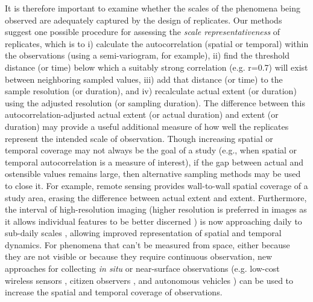 \documentclass[12pt]{article}
\begin{document}
It is therefore important to examine whether the scales of the phenomena being observed are adequately captured by the design of replicates. Our methods suggest one possible procedure for assessing the \emph{scale representativeness} of replicates, which is to i) calculate the autocorrelation (spatial or temporal) within the observations (using a semi-variogram, for example), ii) find the threshold distance (or time) below which a suitably strong correlation (e.g. r=0.7) will exist between neighboring sampled values, iii) add that distance (or time) to the sample resolution (or duration), and iv) recalculate actual extent (or duration) using the adjusted resolution (or sampling duration). The difference between this autocorrelation-adjusted actual extent (or actual duration) and extent (or duration) may provide a useful additional measure of how well the replicates represent the intended scale of observation. Though increasing spatial or temporal coverage may not always be the goal of a study (e.g., when spatial or temporal autocorrelation is a measure of interest), if the gap between actual and ostensible values remains large, then alternative sampling methods may be used to close it. For example, remote sensing provides wall-to-wall spatial coverage of a study area, erasing the difference between actual extent and extent. Furthermore, the interval of high-resolution imaging (higher resolution is preferred in images as it allows individual features to be better discerned \cite{dark_modifiable_2007, hay_comparison_2003}) is now approaching daily to sub-daily scales \cite{drusch_sentinel-2:_2012, hand_startup_2015}, allowing improved representation of spatial and temporal dynamics. For phenomena that can't be measured from space, either because they are not visible or because they require continuous observation, new approaches for collecting \emph{in situ} or near-surface observations (e.g. low-cost wireless sensors \cite{wolf_gsm-based_2012, collins_new_2006, porter_wireless_2005}, citizen observers \cite{dickinson_current_2012}, and autonomous vehicles \cite{anderson_lightweight_2013}) can be used to increase the spatial and temporal coverage of observations.
\end{document}
